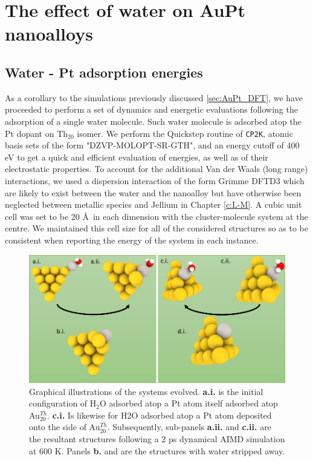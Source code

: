 \section{The effect of water on AuPt nanoalloys}
\label{sec:H2NA}

\subsection{Water - Pt adsorption energies}

As a corollary to the simulations previously discussed \ref{sec:AuPt_DFT}, we have proceeded to perform a set of dynamics and energetic evaluations following the adsorption of a single water molecule. Such water molecule is adsorbed atop the Pt dopant on Th$_{20}$ isomer. We perform the Quickstep routine of \texttt{CP2K}, atomic basis sets of the form "DZVP-MOLOPT-SR-GTH", and an energy cutoff of 400 eV to get a quick and efficient evaluation of energies, as well as of their electrostatic properties. To account for the additional Van der Waals (long range) interactions, we used a dispersion interaction of the form Grimme DFTD3 \cite{Grimme_D3_2017}  which are likely to exist between the water and the nanoalloy but have otherwise been neglected between metallic species and Jellium in Chapter \ref{c:L-M}.  A cubic unit cell was set to be 20 \AA \ in each dimension with the cluster-molecule system at the centre. We maintained this cell size for all of the considered structures so as to be consistent when reporting the energy of the system in each instance.

\begin{figure}[ht!]
    \includegraphics[width=15cm]{figures/LM/AuPt_EPJ/AuPt_Wet.pdf}
    \caption{Graphical illustrations of the systems evolved. \textbf{a.i.} is the initial configuration of H$_2$O adsorbed atop a Pt atom itself adsorbed atop Au$_{20}^{Th}$. \textbf{c.i.} Is likewise for H2O adsorbed atop a Pt atom deposited onto the side of Au$_{20}^{Th}$. Subsequently, sub-panels \textbf{a.ii.} and \textbf{c.ii.} are the resultant structures following a 2 ps dynamical AIMD simulation at 600 K. Panels \textbf{b.} and  are the structures with water stripped away.}
    \label{Fig:cp2k_water}
\end{figure}

